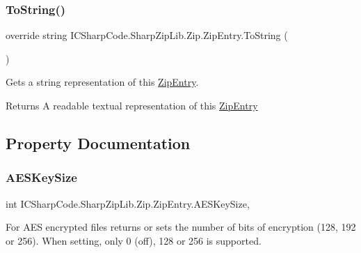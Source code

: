 \subsubsection{\texorpdfstring{To\+String()}{ToString()}\hspace{0.1cm}{\footnotesize\ttfamily [2/2]}}
{\footnotesize\ttfamily override string I\+C\+Sharp\+Code.\+Sharp\+Zip\+Lib.\+Zip.\+Zip\+Entry.\+To\+String (\begin{DoxyParamCaption}{ }\end{DoxyParamCaption})\hspace{0.3cm}{\ttfamily [inline]}}



Gets a string representation of this \hyperlink{class_i_c_sharp_code_1_1_sharp_zip_lib_1_1_zip_1_1_zip_entry}{Zip\+Entry}. 

\begin{DoxyReturn}{Returns}
A readable textual representation of this \hyperlink{class_i_c_sharp_code_1_1_sharp_zip_lib_1_1_zip_1_1_zip_entry}{Zip\+Entry}
\end{DoxyReturn}


\subsection{Property Documentation}
\mbox{\label{class_i_c_sharp_code_1_1_sharp_zip_lib_1_1_zip_1_1_zip_entry_a99419532f302d5c7b04d7b50fbceb8f5}} 
\subsubsection{\texorpdfstring{A\+E\+S\+Key\+Size}{AESKeySize}}
{\footnotesize\ttfamily int I\+C\+Sharp\+Code.\+Sharp\+Zip\+Lib.\+Zip.\+Zip\+Entry.\+A\+E\+S\+Key\+Size\hspace{0.3cm}{\ttfamily [get]}, {\ttfamily [set]}}



For A\+ES encrypted files returns or sets the number of bits of encryption (128, 192 or 256). When setting, only 0 (off), 128 or 256 is supported. 

